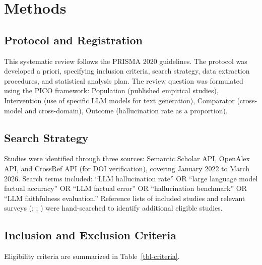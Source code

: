 \documentclass[
  11pt,
  a4paper,
]{article}
\begin{document}
\section{Methods}\label{sec-methods}

\subsection{Protocol and Registration}\label{protocol-and-registration}

This systematic review follows the PRISMA 2020 guidelines. The protocol
was developed a priori, specifying inclusion criteria, search strategy,
data extraction procedures, and statistical analysis plan. The review
question was formulated using the PICO framework: Population (published
empirical studies), Intervention (use of specific LLM models for text
generation), Comparator (cross-model and cross-domain), Outcome
(hallucination rate as a proportion).

\subsection{Search Strategy}\label{search-strategy}

Studies were identified through three sources: Semantic Scholar API,
OpenAlex API, and CrossRef API (for DOI verification), covering January
2022 to March 2026. Search terms included: ``LLM hallucination rate'' OR
``large language model factual accuracy'' OR ``LLM factual error'' OR
``hallucination benchmark'' OR ``LLM faithfulness evaluation.''
Reference lists of included studies and relevant surveys
(;
;
) were hand-searched to
identify additional eligible studies.

\subsection{Inclusion and Exclusion
Criteria}\label{inclusion-and-exclusion-criteria}

Eligibility criteria are summarized in Table~\ref{tbl-criteria}.
\end{document}

